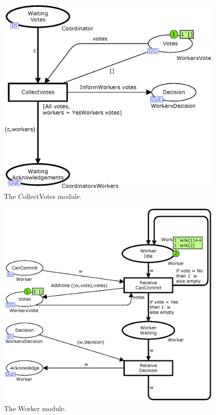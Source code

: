 \begin{figure}[t]
\centering
\includegraphics[width=\columnwidth]{figures/CollectVotes.eps}
\caption{The CollectVotes module.}
\end{figure}

\begin{figure}[t]
\centering
\includegraphics[width=\columnwidth]{figures/Worker.eps}
\caption{The Worker module.}
\end{figure}

